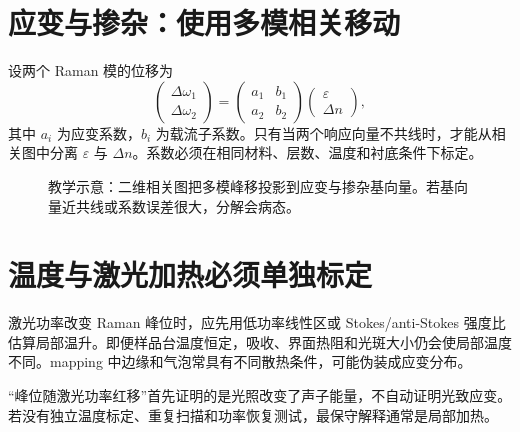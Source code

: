 \documentclass[11pt,a4paper,openany,fontset=fandol]{ctexbook}
\begin{document}
\section{应变与掺杂：使用多模相关移动}

设两个 Raman 模的位移为
\[
\begin{pmatrix}\Delta\omega_1\\\Delta\omega_2\end{pmatrix}
=
\begin{pmatrix}a_1&b_1\\a_2&b_2\end{pmatrix}
\begin{pmatrix}\varepsilon\\\Delta n\end{pmatrix},
\]
其中 $a_i$ 为应变系数，$b_i$ 为载流子系数。只有当两个响应向量不共线时，才能从相关图中分离 $\varepsilon$ 与 $\Delta n$。系数必须在相同材料、层数、温度和衬底条件下标定。

\begin{figure}[H]
\centering
{}
\caption{教学示意：二维相关图把多模峰移投影到应变与掺杂基向量。若基向量近共线或系数误差很大，分解会病态。}
\end{figure}

\section{温度与激光加热必须单独标定}

激光功率改变 Raman 峰位时，应先用低功率线性区或 Stokes/anti-Stokes 强度比估算局部温升。即便样品台温度恒定，吸收、界面热阻和光斑大小仍会使局部温度不同。mapping 中边缘和气泡常具有不同散热条件，可能伪装成应变分布。

\begin{warningbox}
“峰位随激光功率红移”首先证明的是光照改变了声子能量，不自动证明光致应变。若没有独立温度标定、重复扫描和功率恢复测试，最保守解释通常是局部加热。
\end{warningbox}
\end{document}
